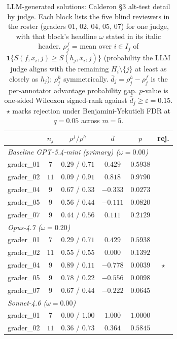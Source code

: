 \begin{table}[p]
\centering\footnotesize
\caption{LLM-generated solutions: Calderon \S3 alt-test detail by judge. Each block lists the five blind reviewers in the roster (graders 01, 02, 04, 05, 07) for one judge, with that block's headline $\omega$ stated in its italic header. $\rho^f_j$ = mean over $i \in I_j$ of $\mathbf{1}\{S(f,x_i,j) \geq S(h_j,x_i,j)\}$ (probability the LLM judge aligns with the remaining $H_i\setminus\{j\}$ at least as closely as $h_j$); $\rho^h_j$ symmetrically. $\bar{d}_j = \rho^h_j - \rho^f_j$ is the per-annotator advantage probability gap. $p$-value is one-sided Wilcoxon signed-rank against $\bar{d}_j \geq \varepsilon = 0.15$. $\star$ marks rejection under Benjamini-Yekutieli FDR at $q=0.05$ across $m=5$.}
\label{tbl-calderon-per-annotator-llm}
\setlength{\tabcolsep}{4pt}
\begin{tabular*}{\textwidth}{@{\extracolsep{\fill}}lccccc@{}}
\toprule
 & $n_j$ & $\rho^f / \rho^h$ & $\bar{d}$ & $p$ & rej. \\
\midrule
\multicolumn{6}{l}{\textit{Baseline GPT-5.4-mini (primary) ($\omega=0.00$)}} \\
\quad grader\_01 & $7$ & $0.29$ / $0.71$ & $0.429$ & $0.5938$ &  \\
\quad grader\_02 & $11$ & $0.09$ / $0.91$ & $0.818$ & $0.9790$ &  \\
\quad grader\_04 & $9$ & $0.67$ / $0.33$ & $-0.333$ & $0.0273$ &  \\
\quad grader\_05 & $9$ & $0.56$ / $0.44$ & $-0.111$ & $0.0820$ &  \\
\quad grader\_07 & $9$ & $0.44$ / $0.56$ & $0.111$ & $0.2129$ &  \\
\multicolumn{6}{l}{\textit{Opus-4.7 ($\omega=0.20$)}} \\
\quad grader\_01 & $7$ & $0.29$ / $0.71$ & $0.429$ & $0.5938$ &  \\
\quad grader\_02 & $11$ & $0.55$ / $0.55$ & $0.000$ & $0.1392$ &  \\
\quad grader\_04 & $9$ & $0.89$ / $0.11$ & $-0.778$ & $0.0039$ & $\star$ \\
\quad grader\_05 & $9$ & $0.78$ / $0.22$ & $-0.556$ & $0.0098$ &  \\
\quad grader\_07 & $9$ & $0.67$ / $0.44$ & $-0.222$ & $0.0645$ &  \\
\multicolumn{6}{l}{\textit{Sonnet-4.6 ($\omega=0.00$)}} \\
\quad grader\_01 & $7$ & $0.00$ / $1.00$ & $1.000$ & $1.0000$ &  \\
\quad grader\_02 & $11$ & $0.36$ / $0.73$ & $0.364$ & $0.5845$ &  \\

\end{tabular*}
\end{table}
